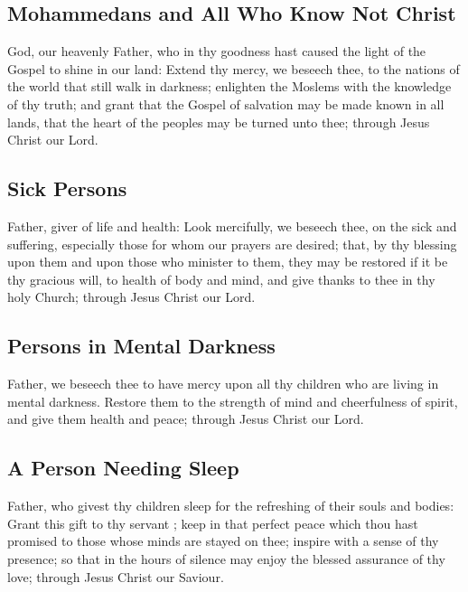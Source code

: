 \subsection{Mohammedans and All Who Know Not Christ}
 God, our heavenly Father, who in thy goodness hast caused the light of the Gospel to shine in our land: Extend thy mercy, we beseech thee, to the nations of the world that still walk in darkness; enlighten the Moslems with the knowledge of thy truth; and grant that the Gospel of salvation may be made known in all lands, that the heart of the peoples may be turned unto thee; through Jesus Christ our Lord.

\subsection{Sick Persons}
 Father, giver of life and health: Look mercifully, we beseech thee, on the sick and suffering, especially those for whom our prayers are desired; that, by thy blessing upon them and upon those who minister to them, they may be restored if it be thy gracious will, to health of body and mind, and give thanks to thee in thy holy Church; through Jesus Christ our Lord.

\subsection{Persons in Mental Darkness}
 Father, we beseech thee to have mercy upon all thy children who are living in mental darkness. Restore them to the strength of mind and cheerfulness of spirit, and give them health and peace; through Jesus Christ our Lord.

\subsection{A Person Needing Sleep}
 Father, who givest thy children sleep for the refreshing of their souls and bodies: Grant this gift to thy servant ; keep  in that perfect peace which thou hast promised to those whose minds are stayed on thee; inspire  with a sense of thy presence; so that in the hours of silence  may enjoy the blessed assurance of thy love; through Jesus Christ our Saviour.

\clearpage
